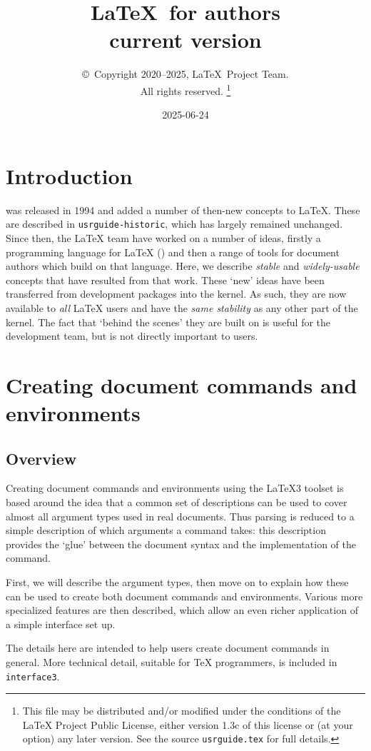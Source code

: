\documentclass{ltxguide}
\title{\LaTeX\ for authors\\ current version}
\author{\copyright~Copyright 2020--2025, \LaTeX\ Project Team.\\
   All rights reserved.%
   \footnote{This file may be distributed and/or modified under the
     conditions of the \LaTeX{} Project Public License, either version 1.3c
     of this license or (at your option) any later version. See the source
    \texttt{usrguide.tex} for full details.}%
}
\date{2025-06-24}
\begin{document}
\maketitle

\tableofcontents

\section{Introduction}

\LaTeXe{} was released in 1994 and added a number of then-new concepts to
\LaTeX{}. These are described in \texttt{usrguide-historic}, which has largely remained
unchanged. Since then, the \LaTeX{} team have worked on a number of ideas,
firstly a programming language for \LaTeX{} () and then a range of
tools for document authors which build on that language. Here, we describe
\emph{stable} and \emph{widely-usable} concepts that have resulted from that
work. These `new' ideas have been transferred from development packages
into the \LaTeXe{} kernel. As such, they are now available to \emph{all}
\LaTeX{} users and have the \emph{same stability} as any other part of the
kernel. The fact that `behind the scenes' they are built on 
is useful for the development team, but is not directly important to users.

\section{Creating document commands and environments}

\subsection{Overview}

Creating document commands and environments using the \LaTeX3 toolset is based
around the idea that a common set of descriptions can be used to cover almost
all argument types used in real documents. Thus parsing is reduced to a simple
description of which arguments a command takes: this description provides the
`glue' between the document syntax and the implementation of the
command.

First, we will describe the argument types, then move on to explain how these
can be used to create both document commands and environments. Various more
specialized features are then described, which allow an even richer application
of a simple interface set up.

The details here are intended to help users create document commands in
general. More technical detail, suitable for \TeX{} programmers, is included
in \texttt{interface3}.
\end{document}
